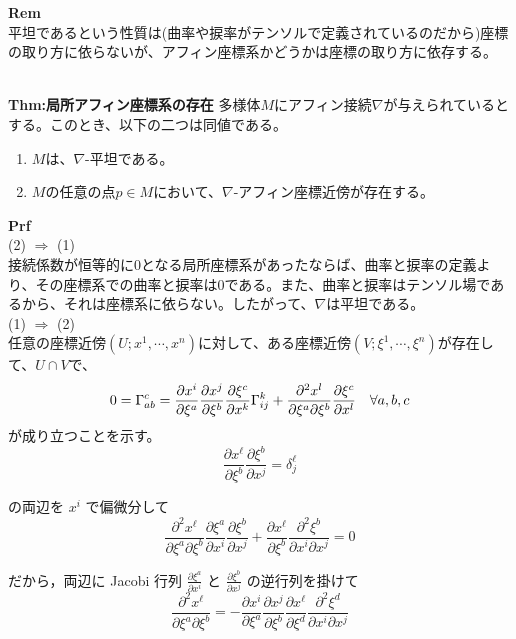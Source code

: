 \documentclass[a4paper,11pt]{jsarticle}
\numberwithin{equation}{section}
\begin{document}
\textbf{Rem}\\
平坦であるという性質は(曲率や捩率がテンソルで定義されているのだから)座標の取り方に依らないが、アフィン座標系かどうかは座標の取り方に依存する。\\\\

\begin{itembox}[l]{\textbf{Thm:局所アフィン座標系の存在}}
    多様体$M$にアフィン接続$\nabla$が与えられているとする。このとき、以下の二つは同値である。
    \begin{enumerate}
        \item $M$は、$\nabla$-平坦である。
        \item $M$の任意の点$p \in M$において、$\nabla$-アフィン座標近傍が存在する。
    \end{enumerate}
\end{itembox}
\textbf{Prf}\\
(2) $\Rightarrow$ (1)\\
接続係数が恒等的に0となる局所座標系があったならば、曲率と捩率の定義より、その座標系での曲率と捩率は0である。また、曲率と捩率はテンソル場であるから、それは座標系に依らない。したがって、$\nabla$は平坦である。\\
(1) $\Rightarrow$ (2)\\
任意の座標近傍$(U;x^1,\cdots,x^n)$に対して、ある座標近傍$(V;\xi^1,\cdots,\xi^n)$が存在して、$U \cap V$で、
\begin{equation}
    0=\Gamma_{ab}^c = \pdv{x^i}{\xi^a}\pdv{x^j}{\xi^b}\pdv{\xi^c}{x^k}\Gamma_{ij}^k + \pdv[2]{x^l}{\xi^a}{\xi^b}\pdv{\xi^c}{x^l} \quad \forall a,b,c
\end{equation}
が成り立つことを示す。\\

\begin{equation}
    \frac{\partial x^\ell}{\partial \xi^b} \frac{\partial \xi^b}{\partial x^j} = \delta^\ell_j
    \end{equation}
    
    の両辺を $x^i$ で偏微分して
    \begin{equation}
    \frac{\partial^2 x^\ell}{\partial \xi^a \partial \xi^b} \frac{\partial \xi^a}{\partial x^i} \frac{\partial \xi^b}{\partial x^j} + \frac{\partial x^\ell}{\partial \xi^b} \frac{\partial^2 \xi^b}{\partial x^i \partial x^j} = 0
    \end{equation}
    
    だから，両辺に Jacobi 行列 $\frac{\partial \xi^a}{\partial x^i}$ と $\frac{\partial \xi^b}{\partial x^j}$ の逆行列を掛けて
    \begin{equation}
    \frac{\partial^2 x^\ell}{\partial \xi^a \partial \xi^b} = -\frac{\partial x^i}{\partial \xi^a} \frac{\partial x^j}{\partial \xi^b} \frac{\partial x^\ell}{\partial \xi^d} \frac{\partial^2 \xi^d}{\partial x^i \partial x^j}
    \end{equation}
    
\end{document}
